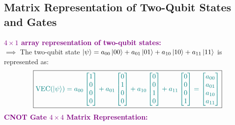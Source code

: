 \documentclass{book}
\begin{document}
\subsection{Matrix Representation of Two-Qubit States and Gates}
\textcolor{purple}{\textbf{$4 \times 1$ array representation of two-qubit states:}}\\
$\implies$ The two-qubit state $\ket{\psi} = a_{00}\ket{00} + a_{01}\ket{01} + a_{10}\ket{10} + a_{11}\ket{11}$ is represented as:
\[
    \boxed{\textcolor{teal}{\text{VEC}(\ket{\psi}) = a_{00}\begin{bmatrix} 1 \\ 0 \\ 0 \\ 0 \end{bmatrix} + a_{01}\begin{bmatrix} 0 \\ 1 \\ 0 \\ 0 \end{bmatrix} + a_{10}\begin{bmatrix} 0 \\ 0 \\ 1 \\ 0 \end{bmatrix} + a_{11}\begin{bmatrix} 0 \\ 0 \\ 0 \\ 1 \end{bmatrix} = \begin{bmatrix} a_{00} \\ a_{01} \\ a_{10} \\ a_{11} \end{bmatrix}}}
\]
\newpage
\textcolor{purple}{\textbf{CNOT Gate $4 \times 4$ Matrix Representation:}}\\
\end{document}
